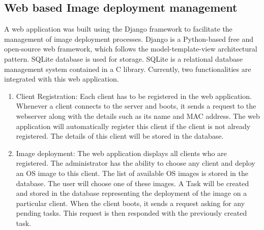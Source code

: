 \documentclass[a4paper,12pt]{article}
\begin{document}
\subsection{Web based Image deployment management}
A web application was built using the Django framework to facilitate the management of image deployment processes. Django is a Python-based free and open-source web framework, which follows the model-template-view architectural pattern. SQLite database is used for storage. SQLite is a relational database management system contained in a C library. Currently, two functionalities are integrated with this web application.
\begin{enumerate}
     \item   Client Registration: Each client has to be registered in the web application. Whenever a client connects to the server and boots, it sends a request to the webserver along with the details such as its name and MAC address. The web application will automatically register this client if the client is not already registered. The details of this client will be stored in the database.
    
    \item Image deployment: The web application displays all clients who are registered. The administrator has the ability to choose any client and deploy an OS image to this client. The list of available OS images is stored in the database. The user will choose one of these images. A Task will be created and stored in the database representing the deployment of the image on a particular client. When the client boots, it sends a request asking for any pending tasks. This request is then responded with the previously created task.
\end{enumerate}
\end{document}
